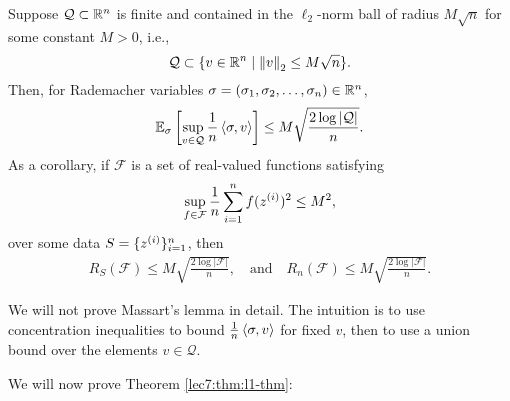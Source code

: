     \begin{lemma}
        Suppose $\mathcal{Q} \subset \R^n$ is finite and contained in the $\ell_2$-norm ball of radius $M\sqrt{n}$ for some constant $M > 0$, i.e.,
        \begin{equation}
            \mathcal{Q} \subset \{v \in \R^n \mid \Norm{v}_2 \leq M\sqrt{n} \}.
        \end{equation}
        Then, for Rademacher variables $\sigma = (\sigma_1,\sigma_2,\dots,\sigma_n) \in \R^n$,
        \begin{equation}
            \E_\sigma \left[ \sup_{v\in \mathcal{Q}} \frac{1}{n}\inprod{\sigma,v} \right] \leq M\sqrt{\frac{2\log|\mathcal{Q}|}{n}}.
        \end{equation}
        As a corollary, if $\mathcal{F}$ is a set of real-valued functions satisfying
        \begin{equation}
            \sup_{f\in\mathcal{F}} \frac{1}{n}\sum_{i=1}^n f(z\sp{i})^2 \leq M^2,
        \end{equation}
        over some data $S = \{z\sp{i}\}_{i=1}^n$, then
        \begin{align}
            R_S(\mathcal{F}) \leq M\sqrt{\frac{2\log|\mathcal{F}|}{n}}, \quad\text{and}\quad
            R_n(\mathcal{F}) \leq M\sqrt{\frac{2\log|\mathcal{F}|}{n}}.
        \end{align}
    \end{lemma}

We will not prove Massart's lemma in detail. The intuition is to use concentration inequalities to bound $\frac{1}{n}\inprod{\sigma, v}$ for fixed $v$, then to use a union bound over the elements $v \in \mathcal{Q}$.

We will now prove Theorem \ref{lec7:thm:l1-thm}:

